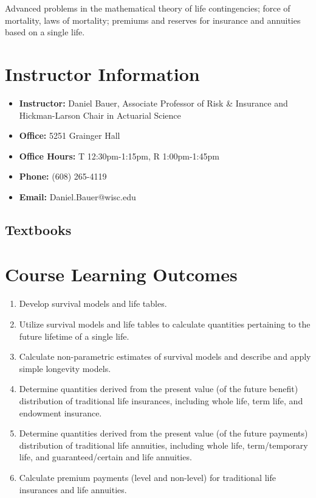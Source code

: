 \documentclass[11pt,fleqn,oneside]{book}
\begin{document}
Advanced problems in the mathematical theory of life contingencies; force of mortality, laws of mortality; premiums and reserves for insurance and annuities based on a single life. 

\section*{Instructor Information}
\begin{itemize}
\item \textbf{Instructor:} Daniel Bauer, Associate Professor of Risk \& Insurance and Hickman-Larson Chair in Actuarial Science
\item \textbf{Office:} 5251 Grainger Hall
\item \textbf{Office Hours:} T 12:30pm-1:15pm, R 1:00pm-1:45pm
\item \textbf{Phone:} (608) 265-4119
\item \textbf{Email:} Daniel.Bauer@wisc.edu
\end{itemize}

\subsection*{Textbooks}

\section*{Course Learning Outcomes}

\begin{enumerate}
\item Develop survival models and life tables. 
\item Utilize survival models and life tables to calculate quantities pertaining to the future lifetime of a single life.
\item Calculate non-parametric estimates of survival models and describe and apply simple longevity models.
\item Determine quantities derived from the present value (of the future benefit) distribution of traditional life insurances, including whole life, term life, and endowment insurance.
\item Determine quantities derived from the present value (of the future payments) distribution of traditional life annuities, including whole life, term/temporary life, and guaranteed/certain and life annuities.
\item Calculate premium payments (level and non-level) for traditional life insurances and life annuities.
\end{enumerate}
\end{document}
